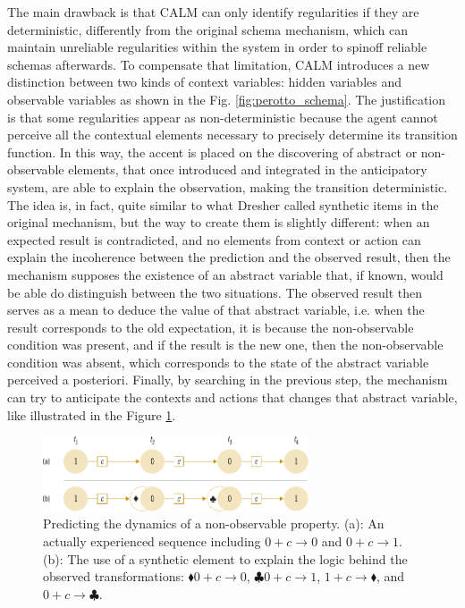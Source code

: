\documentclass[runningheads]{llncs}
\begin{document}
The main drawback is that CALM can only identify regularities if they are deterministic, differently from the original schema mechanism, which can maintain unreliable regularities within the system in order to spinoff reliable schemas afterwards. 
To compensate that limitation, CALM introduces a new distinction between two kinds of context variables: hidden variables and observable variables as shown in the Fig. \ref{fig:perotto_schema}.
The justification is that some regularities appear as non-deterministic because the agent cannot perceive all the contextual elements necessary to precisely determine its transition function.
In this way, the accent is placed on the discovering of abstract or non-observable elements, that once introduced and integrated in the anticipatory system, are able to explain the observation, making the transition deterministic. 
The idea is, in fact, quite similar to what Dresher called synthetic items in the original mechanism, but the way to create them is slightly different: 
when an expected result is contradicted, and no elements from context or action can explain the incoherence between the prediction and the observed result, then the mechanism supposes the existence of an abstract variable that, if known, would be able do distinguish between the two situations.
The observed result then serves as a mean to deduce the value of that abstract variable, i.e. when the result corresponds to the old expectation, it is because the non-observable condition was present, and if the result is the new one, then the non-observable condition was absent, which corresponds to the state of the abstract variable perceived a posteriori.
Finally, by searching in the previous step, the mechanism can try to anticipate the contexts and actions that changes that abstract variable, like illustrated in the Figure \ref{fig:perotto_abstraction}.

\begin{figure}
	\centering
	\includegraphics[width=0.7\textwidth]{Figure_5_CALM_dynamics.pdf}
	\caption{Predicting the dynamics of a non-observable property. 
	(a): An actually experienced sequence including $0 + c \rightarrow 0$ and	 $0 + c \rightarrow 1$.
    (b): The use of a synthetic element to explain the logic behind the observed transformations: $\blacklozenge 0 + c \rightarrow 0$, $\clubsuit 0 + c \rightarrow 1$, $1 + c \rightarrow \blacklozenge$,	 and $0 + c \rightarrow \clubsuit$.} 
	\label{fig:perotto_abstraction}
\end{figure}
\end{document}
